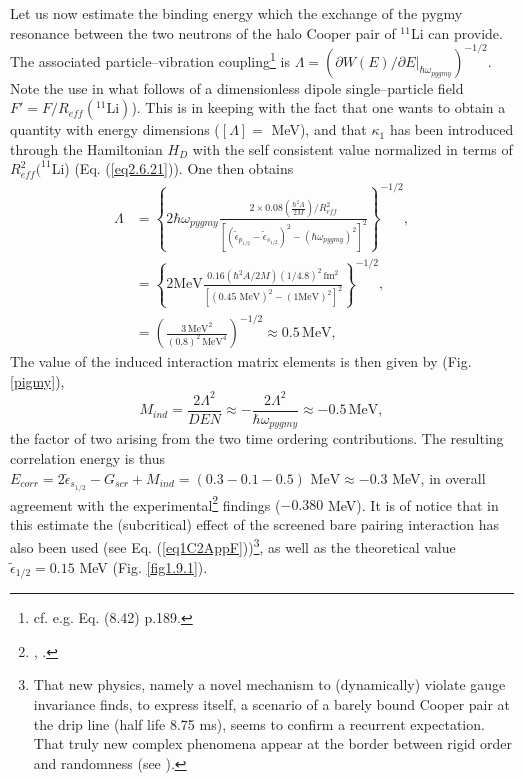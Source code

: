  Let us now estimate the binding energy which the exchange of the pygmy resonance between the two neutrons of the halo Cooper pair  of $^{11}$Li can provide.
The associated particle--vibration coupling\footnote{cf. e.g. \cite{Brink:05} Eq. (8.42) p.189.} is $\Lambda= \left(\partial W(E)/\partial E|_{\hbar\omega_{pygmy}}\right)^{-1/2}$. Note the use in what follows of a dimensionless dipole single--particle field $F'=F/R_{eff}(^{11}\text{Li})$). This is in keeping with the fact that one wants to obtain a quantity with energy dimensions ($[\Lambda]=$ MeV), and that $\kappa_1$ has been introduced through the Hamiltonian $H_D$ with the self consistent value normalized in terms of $R_{eff}^2(^{11}$Li) (Eq. (\ref{eq2.6.21})). 
 One then obtains
\begin{equation}
\begin{split}
\Lambda&=\left\{2\hbar \omega_{pygmy}\frac{2\times 0.08(\frac{\hbar^2A}{2M})/R_{eff}^2}{\left[(\tilde\epsilon_{p_{1/2}}-\tilde\epsilon_{s_{1/2}})^2-(\hbar\omega_{pygmy})^2\right]^2}\right\}^{-1/2},\\
&=\left\{2\text{MeV}\frac{0.16(\hbar^2A/2M)(1/4.8)^2\,\text{fm}^2}{\left[(0.45\text{ MeV})^2-(1\text{MeV})^2\right]^2}\right\}^{-1/2},\\
&=\left(\frac{3\,\text{MeV}^2}{(0.8)^2\,\text{MeV}^4}\right)^{-1/2}\approx 0.5\,\text{MeV},
\end{split}
\end{equation}   
The value of the induced interaction matrix elements is then given by (Fig. \ref{pigmy}),
 \begin{equation}\label{eq2.F.10}
M_{ind}=\frac{2\Lambda^2}{DEN}\approx-\frac{2\Lambda^2}{\hbar\omega_{pygmy}}\approx-0.5\,\text{MeV},
 \end{equation}
 the factor of two arising from the two time ordering contributions. The resulting correlation energy is thus $E_{corr}=2\tilde\epsilon_{s_{1/2}}-G_{scr}+M_{ind}=(0.3-0.1-0.5)\text{ MeV}\approx- 0.3$ MeV, in overall agreement with the experimental\footnote{\cite{Bachelet:08}, \cite{Smith:08}.} findings ($-0.380$ MeV). It is of notice that in this estimate the (subcritical) effect of the screened bare pairing interaction has also been used (see Eq. (\ref{eq1C2AppF}))\footnote{That new physics, namely a novel mechanism to (dynamically) violate gauge invariance finds, to express itself, a scenario of a barely bound Cooper pair at the drip line (half life 8.75 ms), seems to confirm a recurrent expectation. That truly new complex phenomena appear at the border between rigid order and randomness (see \cite{DeGennes:94}).}, as well as  the theoretical value $\tilde\epsilon_{1/2}=0.15$ MeV (Fig. \ref{fig1.9.1}).
 

